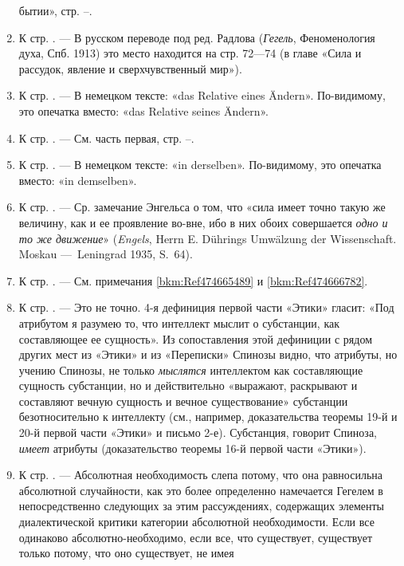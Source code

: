 \begin{enumerate}
бытии», стр. \pageref{bkm:bm85a}–\pageref{bkm:bm85b}.
\item \label{bkm:Ref474667017}К стр. \pageref{bkm:bm86}. — В русском
переводе под ред. Радлова ({\em Гегель}, Феноменология духа, Спб. 1913)
это место находится на стр. 72—74 (в главе «Сила и рассудок, явление и
сверхчувственный мир»).
\item \label{bkm:Ref474667030}К стр. \pageref{bkm:bm87}. — В немецком
тексте: «das Relative eines Ändern». По-видимому, это опечатка вместо: «das
Relative seines Ändern».
\item \label{bkm:Ref474667041}К стр. \pageref{bkm:bm88}. — См. часть первая,
стр. \pageref{bkm:bm88a}–\pageref{bkm:bm88b}.
\item \label{bkm:Ref474667057}К стр. \pageref{bkm:bm89}. — В немецком
тексте: «in derselben». По-видимому, это опечатка вместо: «in demselben».
\item \label{bkm:Ref474667072}К стр. \pageref{bkm:bm90}. — Ср. замечание
Энгельса о том, что «сила имеет точно такую же величину, как и ее
проявление во-вне, ибо в них обоих совершается {\em одно и то же
движение}» ({\em Engels}, Herrn E. Dührings Umwälzung der Wissenschaft.
Moskau —~Leningrad 1935, S.~64).
\item \label{bkm:Ref474669620}К стр. \pageref{bkm:bm91}. — См. примечания
\ref{bkm:Ref474665489} и \ref{bkm:Ref474666782}.
\item \label{bkm:Ref474669634}К стр. \pageref{bkm:bm92}. — Это не точно. 4-я
дефиниция первой части «Этики» гласит: «Под атрибутом я разумею то, что
интеллект мыслит о субстанции, как составляющее ее сущность». Из
сопоставления этой дефиниции с рядом других мест из «Этики» и из
«Переписки» Спинозы видно, что атрибуты, но учению Спинозы, не только
{\em мыслятся} интеллектом как составляющие сущность субстанции, но и
действительно «выражают, раскрывают и составляют вечную сущность и вечное
существование» субстанции безотносительно к интеллекту (см., например,
доказательства теоремы 19-й и 20-й первой части «Этики» и письмо 2-е).
Субстанция, говорит Спиноза, {\em имеет} атрибуты (доказательство
теоремы 16-й первой части «Этики»).
\item \label{bkm:Ref474669669}К стр. \pageref{bkm:bm93}. — Абсолютная
необходимость слепа потому, что она равносильна абсолютной случайности, как
это более определенно намечается Гегелем в непосредственно следующих за
этим рассуждениях, содержащих элементы диалектической критики категории
абсолютной необходимости. Если все одинаково абсолютно-необходимо, если
все, что существует, существует только потому, что оно существует, не имея

\end{enumerate}
